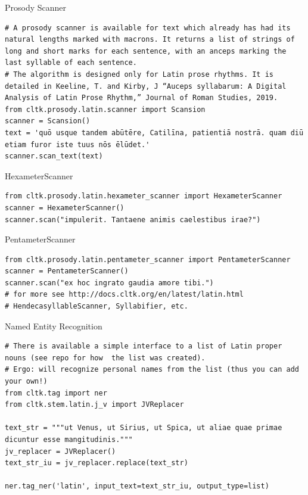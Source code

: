 \documentclass[10pt]{beamer}
\begin{document}
\begin{frame}{Prosody Scanner} 
\begin{verbatim}
# A prosody scanner is available for text which already has had its natural lengths marked with macrons. It returns a list of strings of long and short marks for each sentence, with an anceps marking the last syllable of each sentence.
# The algorithm is designed only for Latin prose rhythms. It is detailed in Keeline, T. and Kirby, J “Auceps syllabarum: A Digital Analysis of Latin Prose Rhythm,” Journal of Roman Studies, 2019.
from cltk.prosody.latin.scanner import Scansion
scanner = Scansion()
text = 'quō usque tandem abūtēre, Catilīna, patientiā nostrā. quam diū etiam furor iste tuus nōs ēlūdet.'
scanner.scan_text(text)
\end{verbatim}
\end{frame}

\begin{frame}{HexameterScanner} 
\begin{verbatim}
from cltk.prosody.latin.hexameter_scanner import HexameterScanner
scanner = HexameterScanner()
scanner.scan("impulerit. Tantaene animis caelestibus irae?")
\end{verbatim}
\end{frame}


\begin{frame}{PentameterScanner} 
\begin{verbatim}
from cltk.prosody.latin.pentameter_scanner import PentameterScanner
scanner = PentameterScanner()
scanner.scan("ex hoc ingrato gaudia amore tibi.")
# for more see http://docs.cltk.org/en/latest/latin.html
# HendecasyllableScanner, Syllabifier, etc.
\end{verbatim}
\end{frame}

\begin{frame}{Named Entity Recognition} 
\begin{verbatim}
# There is available a simple interface to a list of Latin proper nouns (see repo for how  the list was created). 
# Ergo: will recognize personal names from the list (thus you can add your own!)
from cltk.tag import ner
from cltk.stem.latin.j_v import JVReplacer

text_str = """ut Venus, ut Sirius, ut Spica, ut aliae quae primae dicuntur esse mangitudinis."""
jv_replacer = JVReplacer()
text_str_iu = jv_replacer.replace(text_str)

ner.tag_ner('latin', input_text=text_str_iu, output_type=list)
\end{verbatim}
\end{frame}
\end{document}
